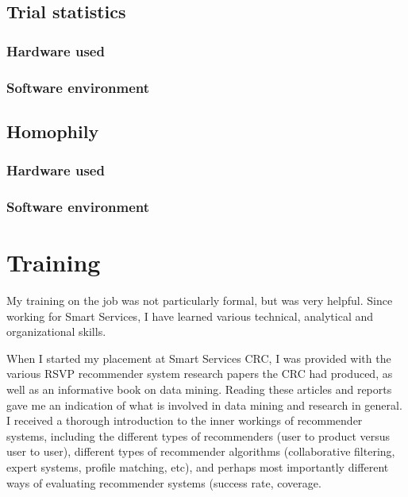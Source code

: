 \documentclass{report}
\begin{document}
\section{Trial statistics}

\subsection{Hardware used}

\subsection{Software environment}


\section{Homophily}

\subsection{Hardware used}

\subsection{Software environment}


\chapter{Training}
My training on the job was not particularly formal, but was very helpful. Since working for Smart Services, I have learned various technical, analytical and organizational skills.

When I started my placement at Smart Services CRC, I was provided with the various RSVP recommender system research papers the CRC had produced, as well as an informative book on data mining. Reading these articles and reports gave me an indication of what is involved in data mining and research in general. I received a thorough introduction to the inner workings of recommender systems, including the different types of recommenders (user to product versus user to user), different types of recommender algorithms (collaborative filtering, expert systems, profile matching, etc), and perhaps most importantly different ways of evaluating recommender systems (success rate, coverage.
\end{document}
